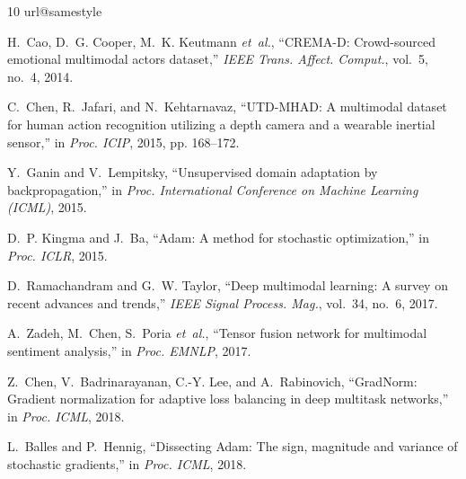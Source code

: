 \documentclass[conference]{IEEEtran}
\begin{document}
\begin{thebibliography}{10}
\providecommand{\url}[1]{#1}
\csname url@samestyle\endcsname
\providecommand{\newblock}{\relax}
\providecommand{\bibinfo}[2]{#2}
\providecommand{\BIBentrySTDinterwordspacing}{\spaceskip=0pt\relax}
\providecommand{\BIBentryALTinterwordstretchfactor}{4}
\providecommand{\BIBentryALTinterwordspacing}{\spaceskip=\fontdimen2\font plus
\BIBentryALTinterwordstretchfactor\fontdimen3\font minus \fontdimen4\font\relax}
\providecommand{\BIBforeignlanguage}[2]{{%
\expandafter\ifx\csname l@#1\endcsname\relax
\typeout{** WARNING: IEEEtran.bst: No hyphenation pattern has been}%
\typeout{** loaded for the language `#1'. Using the pattern for}%
\typeout{** the default language instead.}%
\else
\language=\csname l@#1\endcsname
\fi
#2}}
\providecommand{\BIBdecl}{\relax}
\BIBdecl

H.~Cao, D.~G. Cooper, M.~K. Keutmann \emph{et~al.}, ``{CREMA-D}: Crowd-sourced emotional multimodal actors dataset,'' \emph{IEEE Trans. Affect. Comput.}, vol.~5, no.~4, 2014.

C.~Chen, R.~Jafari, and N.~Kehtarnavaz, ``{UTD-MHAD}: A multimodal dataset for human action recognition utilizing a depth camera and a wearable inertial sensor,'' in \emph{Proc. ICIP}, 2015, pp. 168--172.

Y.~Ganin and V.~Lempitsky, ``Unsupervised domain adaptation by backpropagation,'' in \emph{Proc. International Conference on Machine Learning (ICML)}, 2015.

D.~P. Kingma and J.~Ba, ``{Adam}: A method for stochastic optimization,'' in \emph{Proc. ICLR}, 2015.

D.~Ramachandram and G.~W. Taylor, ``Deep multimodal learning: A survey on recent advances and trends,'' \emph{IEEE Signal Process. Mag.}, vol.~34, no.~6, 2017.

A.~Zadeh, M.~Chen, S.~Poria \emph{et~al.}, ``Tensor fusion network for multimodal sentiment analysis,'' in \emph{Proc. EMNLP}, 2017.

Z.~Chen, V.~Badrinarayanan, C.-Y. Lee, and A.~Rabinovich, ``{GradNorm}: Gradient normalization for adaptive loss balancing in deep multitask networks,'' in \emph{Proc. ICML}, 2018.

L.~Balles and P.~Hennig, ``Dissecting {Adam}: The sign, magnitude and variance of stochastic gradients,'' in \emph{Proc. ICML}, 2018.


\end{thebibliography}
\end{document}
